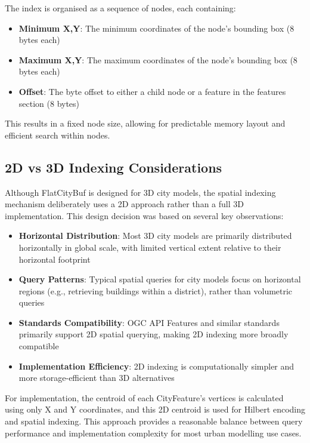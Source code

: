 The index is organised as a sequence of nodes, each containing:

\begin{itemize}
    \item \textbf{Minimum X,Y}: The minimum coordinates of the node's bounding box (8 bytes each)
    \item \textbf{Maximum X,Y}: The maximum coordinates of the node's bounding box (8 bytes each)
    \item \textbf{Offset}: The byte offset to either a child node or a feature in the features section (8 bytes)
\end{itemize}

This results in a fixed node size, allowing for predictable memory layout and efficient search within nodes.

\subsection{2D vs 3D Indexing Considerations}
\label{methodology:spatial_index:2d_vs_3d_indexing}

Although FlatCityBuf is designed for 3D city models, the spatial indexing mechanism deliberately uses a 2D approach rather than a full 3D implementation. This design decision was based on several key observations:

\begin{itemize}
    \item \textbf{Horizontal Distribution}: Most 3D city models are primarily distributed horizontally in global scale, with limited vertical extent relative to their horizontal footprint
    \item \textbf{Query Patterns}: Typical spatial queries for city models focus on horizontal regions (e.g., retrieving buildings within a district), rather than volumetric queries
    \item \textbf{Standards Compatibility}: OGC API Features and similar standards primarily support 2D spatial querying, making 2D indexing more broadly compatible 
    \item \textbf{Implementation Efficiency}: 2D indexing is computationally simpler and more storage-efficient than 3D alternatives
\end{itemize}

For implementation, the centroid of each CityFeature's vertices is calculated using only X and Y coordinates, and this 2D centroid is used for Hilbert encoding and spatial indexing. This approach provides a reasonable balance between query performance and implementation complexity for most urban modelling use cases.

